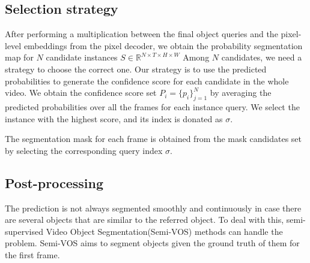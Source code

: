 


\subsection{Selection strategy}

After performing a multiplication between the final object queries and the pixel-level embeddings from the pixel decoder, we obtain the probability segmentation map for $N$ candidate instances $S \in \mathbb{R}^{N \times T \times H \times W}$
Among $N$ candidates, we need a strategy to choose the correct one. Our strategy is to use the predicted probabilities to generate the confidence score for each candidate in the whole video. We obtain the confidence score set $P_i = \{p_{i}\}^N_{j = 1}$ by averaging the predicted probabilities over all the frames for each instance query. We select the instance with the highest score, and its index is donated as $\sigma$. 

The segmentation mask for each frame is obtained from the mask candidates set by selecting the corresponding query index $\sigma$. 

\subsection{Post-processing}
The prediction is not always segmented smoothly and continuously in case there are several objects that are similar to the referred object. To deal with this, semi-supervised Video Object Segmentation(Semi-VOS) methods can handle the problem. Semi-VOS aims to segment objects given the ground truth of them for the first frame.   

